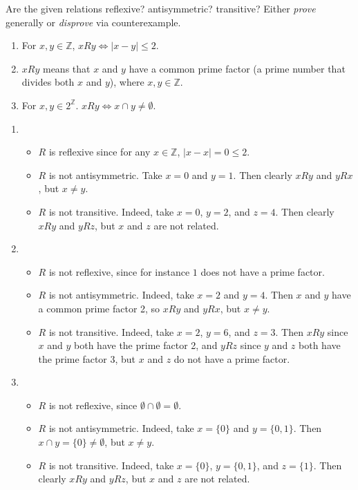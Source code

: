 \documentclass{article}
\newcommand{\Z}{\mathbb{Z}}
\theoremstyle{definition}
\begin{document}
\begin{question}
    Are the given relations reflexive? antisymmetric? transitive? Either \textit{prove} generally or \textit{disprove} via 
    counterexample.
    	\begin{enumerate}
	\item For $x, y \in \Z$,  $x R y \iff |x - y| \leq 2$. 
	\item  $x R y$ means that $x$ and $y$ have a common prime factor (a prime number that divides both $x$ and $y$), 
	where $x, y \in \Z$.
	\item For $x, y \in 2^{\Z}$. $x R y \iff x \cap y \neq \emptyset$.
	\end{enumerate}
\end{question}
\begin{solution}
\begin{enumerate}
	\item
\begin{itemize}
		\item $ R$ is reflexive since for any $x \in \Z$, $|x-x|  = 0 \leq 2$.
		\item $ R$ is not antisymmetric. Take $x = 0$ and $y = 1$. Then clearly $x  R y$ and $y  R x$, but $x \neq y$.
		\item $ R$ is not transitive. Indeed, take $x = 0$, $y = 2$, and $z = 4$. Then clearly $x  R y$ and $y  R z$, but $x$ and $z$ are not related.
	\end{itemize}
	
	\item 
	\begin{itemize}
		\item $ R$ is not reflexive, since for instance $1$ does not have a prime factor.
		\item $ R$ is not antisymmetric. Indeed, take $x = 2$ and $y = 4$. Then $x$ and $y$ have a common prime factor 2, so $x  R y$ and $y  R x$, but $x \neq y$.
		\item $ R$ is not transitive. Indeed, take $x = 2$, $y = 6$, and $z = 3$. Then $x  R y$ since $x$ and $y$ both have the prime factor 2, and $y  R z$ since $y$ and $z$ both have the prime factor 3, but $x$ and $z$ do not have a prime factor.
	\end{itemize}
	
	\item 
	\begin{itemize}
		\item $ R$ is not reflexive, since $\emptyset \cap \emptyset = \emptyset$.
		\item $ R$ is not antisymmetric. Indeed, take $x = \{ 0 \}$ and $y = \{0,1\}$. Then $x \cap y = \{0 \} \neq \emptyset$, but $x \neq y$.
		\item $ R$ is not transitive. Indeed, take $x = \{ 0 \}$, $y = \{0,1\}$, and $z = \{1\}$. Then clearly $x  R y$ and $y  R z$, but $x$ and $z$ are not related.
	\end{itemize}
     \end{enumerate}
\end{solution}
\end{document}
